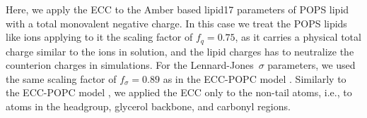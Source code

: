 \documentclass[journal=jpcbfk,manuscript=article]{achemso}
\begin{document}
Here, we apply the ECC to the Amber based lipid17 parameters \cite{lipid17-future} of POPS lipid with
a total monovalent negative charge. 
In this case we treat the POPS lipids like ions
applying to it the scaling factor of $f_q = 0.75$,
as it carries a physical total charge similar to the ions in solution, 
and the lipid charges has to neutralize the counterion charges in simulations.
For the Lennard-Jones~$\sigma$ parameters, we used the same scaling factor of $f_\sigma = 0.89$
as in the ECC-POPC model \cite{melcr18}.
Similarly to the ECC-POPC model \cite{melcr18}, we applied the ECC only to the
non-tail atoms, i.e., to atoms in the headgroup, glycerol backbone, and carbonyl regions. 


\end{document}
